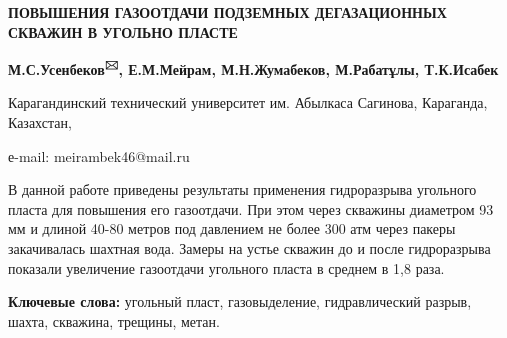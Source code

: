 \begin{center}
{\large\bfseries ПОВЫШЕНИЯ ГАЗООТДАЧИ ПОДЗЕМНЫХ ДЕГАЗАЦИОННЫХ СКВАЖИН В УГОЛЬНО
ПЛАСТЕ}

{\bfseries М.С.Усенбеков\textsuperscript{🖂}, Е.М.Мейрам, М.Н.Жумабеков,
М.Рабатұлы, Т.К.Исабек}

Карагандинский технический университет им. Абылкаса Сагинова, Караганда,
Казахстан,

е-mail: meirambek46@mail.ru
\end{center}

В данной работе приведены результаты применения гидроразрыва угольного
пласта для повышения его газоотдачи. При этом через скважины диаметром
93 мм и длиной 40-80 метров под давлением не более 300 атм через пакеры
закачивалась шахтная вода. Замеры на устье скважин до и после
гидроразрыва показали увеличение газоотдачи угольного пласта в среднем в
1,8 раза.

{\bfseries Ключевые слова:} угольный пласт, газовыделение, гидравлический
разрыв, шахта, скважина, трещины, метан.

